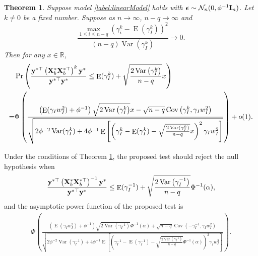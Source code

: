 \documentclass[bj]{imsart}
\DeclareMathOperator{\myE}{E}
\DeclareMathOperator{\myVar}{Var}
\DeclareMathOperator{\myCov}{Cov}
\newcommand{\By}{\mathbf{y}}    \newcommand{\Bz}{\mathbf{z}}
\theoremstyle{plain}
\newtheorem{theorem}{\quad\quad Theorem}
\theoremstyle{definition}
\theoremstyle{remark}
\begin{document}
\begin{theorem}\label{generalTheorem}
    Suppose model \eqref{label:linearModel} holds with $\boldsymbol{\epsilon}\sim \mathcal N_n (0,\phi^{-1} \mathbf{I}_n)$.
    Let $k\neq 0$ be a fixed number.
    Suppose as $n\to \infty$, $n-q\to \infty$ and
\begin{equation}
    \frac{
        \max_{1\leq i \leq n-q}
        \left( 
        \gamma_i^k
            -
                \myE (\gamma_I^k)
        \right)^2
    }{
        (n-q) \myVar (\gamma_I^k)
    }\to 0.
    \label{eq:toBeCondition}
\end{equation}
Then for any $x\in \mathbb R$,
\begin{equation*}
    \begin{split}
    &\Pr\left( 
        \frac{
            \By^{*\top} \left( \BX_b^* \BX_b^{*\top} \right)^k \By^*
        }{
            \By^{*\top} \By^*
        } 
        \leq 
        \myE (\gamma_I^k)
        +\sqrt{
            \frac{2\myVar\left( \gamma_I^k \right)}{n-q} 
        }
        x
    \right) 
    \\
    =&
    \Phi\left( 
        \frac{
            \left( \myE (\gamma_I w_I^2) + \phi^{-1} \right)
            \sqrt{{2\myVar\left( \gamma_I^k \right)}} 
            x
            -
            \sqrt{n-q}
            \myCov\left( \gamma_I^k, \gamma_I w_I^2 \right)
        }{
            \sqrt{
                2\phi^{-2} \myVar ( \gamma_I^k ) 
                +
                4\phi^{-1}
     \myE\left[ 
        \left( \gamma_I^k -\myE(\gamma_I^k) -\sqrt{\frac{2\myVar (\gamma_I^k)}{n-q}}x \right)^2
        \gamma_I w_I^2
    \right]
            }
        } 
    \right)
    +o(1)
    .
    \end{split}
\end{equation*}

\end{theorem}
Under the conditions of Theorem \ref{generalTheorem}, the proposed test should reject the null hypothesis when
\begin{equation*}
        \frac{
            \By^{*\top} \left( \BX_b^* \BX_b^{*\top} \right)^{-1} \By^*
        }{
            \By^{*\top} \By^*
        } 
        \leq 
        \myE (\gamma_I^{-1})
        +\sqrt{
            \frac{2\myVar\left( \gamma_I^{-1} \right)}{n-q} 
        }
        \Phi^{-1}(\alpha),
\end{equation*}
and the asymptotic power function of the proposed test is
\begin{equation}\label{eq:powerProposed}
    \begin{split}
    \Phi\left( 
        \frac{
            \left( \myE (\gamma_I w_I^2) + \phi^{-1} \right)
            \sqrt{2\myVar\left( \gamma_I^{-1} \right)} 
            \Phi^{-1}(\alpha)
            +
            \sqrt{n-q}
            \myCov\left( - \gamma_I^{-1}, \gamma_I w_I^2 \right)
        }{
            \sqrt{
                2\phi^{-2} \myVar ( \gamma_I^{-1} ) 
                +
                4\phi^{-1}
        \myE\left[ 
            \left( \gamma_I^{-1} -\myE(\gamma_I^{-1}) -\sqrt{\frac{2\myVar (\gamma_I^{-1})}{n-q}} \Phi^{-1}(\alpha) \right)^2
        \gamma_I w_I^2
    \right]
            }
        } 
    \right).
    \end{split}
\end{equation}
\end{document}
